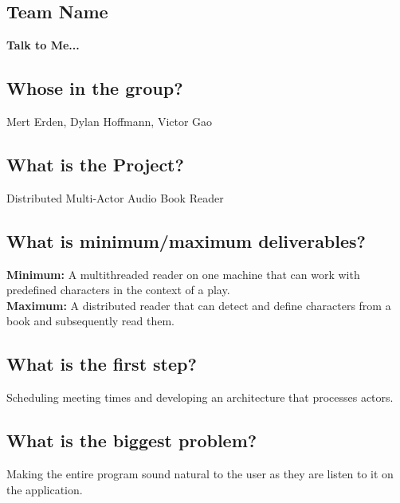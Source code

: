 \documentclass{article}
\begin{document}
\subsection*{Team Name}
\textbf{Talk to Me...}

\subsection*{Whose in the group?}
Mert Erden, Dylan Hoffmann, Victor Gao

\subsection*{What is the Project?}
Distributed Multi-Actor Audio Book Reader

\subsection*{What is minimum/maximum deliverables?}
\textbf{Minimum: }\large{A multithreaded reader on one machine that can work with
predefined characters in the context of a play.}\\
\textbf{Maximum: }\large{A distributed reader that can detect and define characters
from a book and subsequently read them.}

\subsection*{What is the first step?}

Scheduling meeting times and developing an architecture that processes actors.


\subsection*{What is the biggest problem?}

Making the entire program sound natural to the user as they are listen to it on
the application.
\end{document}
